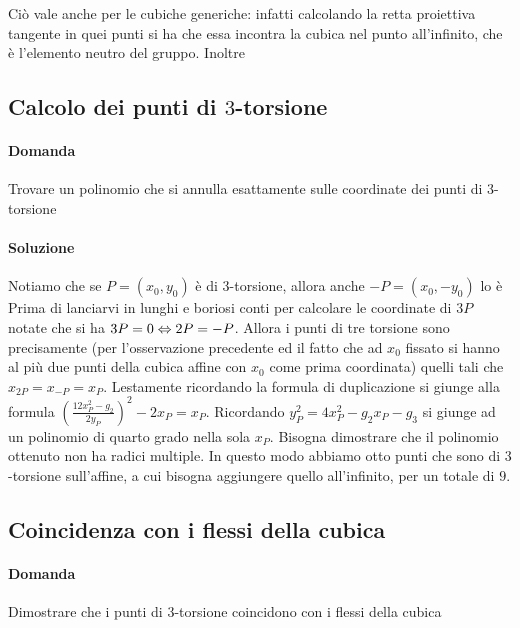Ciò vale anche per le cubiche generiche: infatti calcolando la retta proiettiva tangente in quei punti si ha che essa incontra la cubica nel punto all'infinito, che è l'elemento neutro del gruppo.
Inoltre 

\subsection{Calcolo dei punti di $3$-torsione}
\paragraph{Domanda} Trovare un polinomio che si annulla esattamente sulle coordinate dei punti di $3$-torsione

\paragraph{Soluzione}
 Notiamo che se $P = (x_0, y_0)$ è di $3$-torsione, allora anche $-P = (x_0, -y_0)$ lo è
 Prima di lanciarvi in lunghi e boriosi conti per calcolare le coordinate di $3P$ notate che si ha $3P = 0 \Leftrightarrow 2P = -P$. Allora i punti di tre torsione sono precisamente (per l'osservazione precedente ed il fatto che ad $x_0$ fissato si hanno al più due punti della cubica affine con $x_0$ come prima coordinata) quelli tali che $x_{2P} = x_{-P} = x_{P}$. Lestamente ricordando la formula di duplicazione si giunge alla formula $\left( \frac{12 x_P^2 - g_2}{2 y_P} \right)^2 - 2 x_P = x_P$. Ricordando $y_P^2 = 4 x_P^2 - g_2 x_P - g_3$ si giunge ad un polinomio di quarto grado nella sola $x_P$.
 Bisogna dimostrare che il polinomio ottenuto non ha radici multiple. In questo modo abbiamo otto punti che sono di $3$-torsione sull'affine, a cui bisogna aggiungere quello all'infinito, per un totale di $9$.

\subsection{Coincidenza con i flessi della cubica}
\paragraph{Domanda} Dimostrare che i punti di $3$-torsione coincidono con i flessi della cubica


